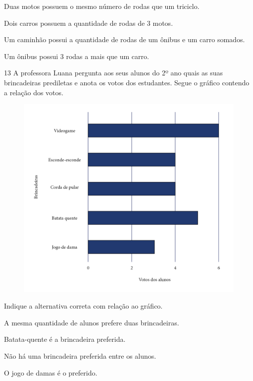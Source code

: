 \begin{escolha}[itemsep=-5pt]
\item Duas motos possuem o mesmo número de rodas que um triciclo.

\item Dois carros possuem a quantidade de rodas de 3 motos.

\item Um caminhão possui a quantidade de rodas de um ônibus e um carro somados.

\item Um ônibus possui 3 rodas a mais que um carro.
\end{escolha}

\num{13} A professora Luana pergunta aos seus alunos do 2º ano quais as suas
brincadeiras prediletas e anota os votos dos estudantes. Segue o gráfico
contendo a relação dos votos.

\begin{figure}[H]
\includegraphics[width=\textwidth]{./media/image158.png}
\end{figure}

Indique a alternativa correta com relação ao gráfico.

\begin{escolha}[itemsep=-5pt]
\item A mesma quantidade de alunos prefere duas brincadeiras.

\item Batata-quente é a brincadeira preferida.

\item Não há uma brincadeira preferida entre os alunos.

\item O jogo de damas é o preferido.
\end{escolha}

